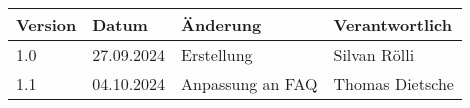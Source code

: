 \documentclass[../main.tex]{subfiles}
\begin{document}
\begin{tabularx}{\textwidth}{l l X l}
        \textbf{Version} & \textbf{Datum} & \textbf{Änderung} & \textbf{Verantwortlich} \\ \hline
        1.0 & 27.09.2024 & Erstellung & Silvan Rölli \\ \hline
        1.1 & 04.10.2024 & Anpassung an FAQ & Thomas Dietsche \\ \hline
\end{tabularx}
\end{document}
